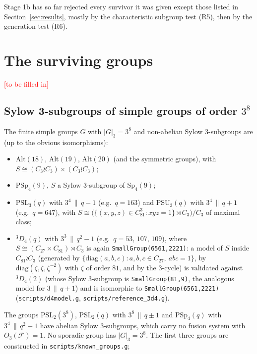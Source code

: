 \documentclass[11pt]{article}
\theoremstyle{definition}
\theoremstyle{remark}
\newcommand{\F}{\mathcal{F}}
\newcommand{\PSL}{\mathrm{PSL}}
\newcommand{\PSU}{\mathrm{PSU}}
\newcommand{\PSp}{\mathrm{PSp}}
\newcommand{\Alt}{\mathrm{Alt}}
\begin{document}
\begin{center}

\end{center}

Stage 1b has so far rejected every survivor it was given except those
listed in Section~\ref{sec:results}, mostly by the characteristic subgroup
test (R5), then by the generation test (R6).

\section{The surviving groups}\label{sec:groups}
\textcolor{red}{[to be filled in]}

\subsection{Sylow 3-subgroups of simple groups of order $3^8$}\label{sec:simple}
The finite simple groups $G$ with $|G|_3=3^8$ and non-abelian Sylow
$3$-subgroups are (up to the obvious isomorphisms):
\begin{itemize}
\item $\Alt(18)$, $\Alt(19)$, $\Alt(20)$ (and the symmetric groups), with
  $S\cong (C_3\wr C_3)\times(C_3\wr C_3)$;
\item $\PSp_4(9)$, $S$ a Sylow $3$-subgroup of $\mathrm{Sp}_4(9)$;
\item $\PSL_3(q)$ with $3^4\,\|\,q-1$ (e.g.\ $q=163$) and $\PSU_3(q)$ with
  $3^4\,\|\,q+1$ (e.g.\ $q=647$), with $S\cong\big(\{(x,y,z)\in C_{81}^3 :
  xyz=1\}\rtimes C_3\big)/C_3$ of maximal class;
\item ${}^3D_4(q)$ with $3^3\,\|\,q^2-1$ (e.g.\ $q=53$, $107$, $109$), where
  $S\cong(C_{27}\times C_{81})\rtimes C_3$ is again
  \texttt{SmallGroup(6561,2221)}: a model of $S$ inside $C_{81}\wr C_3$
  (generated by $\{\mathrm{diag}(a,b,c): a,b,c\in C_{27},\ abc=1\}$, by
  $\mathrm{diag}(\zeta,\zeta,\zeta^{-2})$ with $\zeta$ of order $81$, and by the
  $3$-cycle) is validated against ${}^3D_4(2)$ (whose Sylow $3$-subgroup is
  \texttt{SmallGroup(81,9)}, the analogous model for $3\,\|\,q+1$) and is
  isomorphic to \texttt{SmallGroup(6561,2221)} (\texttt{scripts/d4model.g},
  \texttt{scripts/reference\_3d4.g}).
\end{itemize}
The groups $\PSL_2(3^8)$, $\PSL_2(q)$ with $3^8\,\|\,q\pm1$ and $\PSp_4(q)$
with $3^4\,\|\,q^2-1$ have abelian Sylow $3$-subgroups, which carry no
fusion system with $O_3(\F)=1$.  No sporadic group has $|G|_3=3^8$.
The first three groups are constructed in \texttt{scripts/known\_groups.g};
\end{document}
